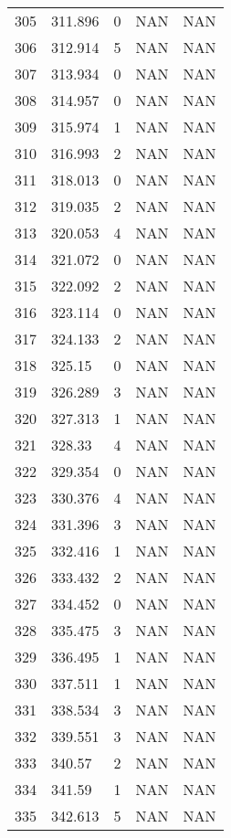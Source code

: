 \documentclass{article}
\begin{document}
\begin{longtable}{@{}lllll@{}}
					305 & 311.896 & 0     & NAN   & NAN   \\
					306 & 312.914 & 5     & NAN   & NAN   \\
					307 & 313.934 & 0     & NAN   & NAN   \\
					308 & 314.957 & 0     & NAN   & NAN   \\
					309 & 315.974 & 1     & NAN   & NAN   \\
					310 & 316.993 & 2     & NAN   & NAN   \\
					311 & 318.013 & 0     & NAN   & NAN   \\
					312 & 319.035 & 2     & NAN   & NAN   \\
					313 & 320.053 & 4     & NAN   & NAN   \\
					314 & 321.072 & 0     & NAN   & NAN   \\
					315 & 322.092 & 2     & NAN   & NAN   \\
					316 & 323.114 & 0     & NAN   & NAN   \\
					317 & 324.133 & 2     & NAN   & NAN   \\
					318 & 325.15  & 0     & NAN   & NAN   \\
					319 & 326.289 & 3     & NAN   & NAN   \\
					320 & 327.313 & 1     & NAN   & NAN   \\
					321 & 328.33  & 4     & NAN   & NAN   \\
					322 & 329.354 & 0     & NAN   & NAN   \\
					323 & 330.376 & 4     & NAN   & NAN   \\
					324 & 331.396 & 3     & NAN   & NAN   \\
					325 & 332.416 & 1     & NAN   & NAN   \\
					326 & 333.432 & 2     & NAN   & NAN   \\
					327 & 334.452 & 0     & NAN   & NAN   \\
					328 & 335.475 & 3     & NAN   & NAN   \\
					329 & 336.495 & 1     & NAN   & NAN   \\
					330 & 337.511 & 1     & NAN   & NAN   \\
					331 & 338.534 & 3     & NAN   & NAN   \\
					332 & 339.551 & 3     & NAN   & NAN   \\
					333 & 340.57  & 2     & NAN   & NAN   \\
					334 & 341.59  & 1     & NAN   & NAN   \\
					335 & 342.613 & 5     & NAN   & NAN   \\

\end{longtable}
\end{document}
